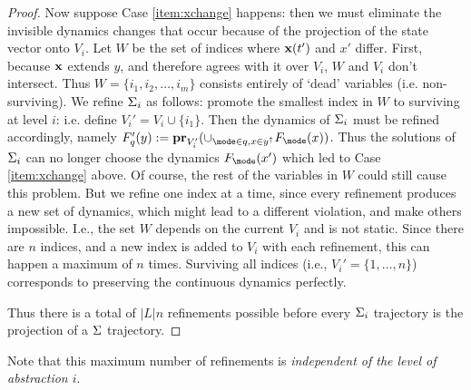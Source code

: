 \begin{proof}
	Now suppose Case \ref{item:xchange} happens: then we must eliminate the invisible dynamics changes that occur because of the projection of the state vector onto $V_i$.
	Let $W$ be the set of indices where $\mathbf{x}(t')$ and $x'$ differ. 
	First, because $\mathbf{x}$ extends $y$, and therefore agrees with it over $V_i$, $W$ and $V_i$ don't intersect. 
	Thus $W = \{i_1,i_2,\ldots,i_m\}$ consists entirely of `dead' variables (i.e. non-surviving).
	We refine $\Sigma_i$ as follows: promote the smallest index in $W$ to surviving at level $i$: i.e. define $V_i' = V_i \cup \{i_1\}$.
	Then the dynamics of $\Sigma_i$ must be refined accordingly, namely 
	$F'_q(y) \defeq \proj{\cup_{\mode \in q,x \in y^\uparrow}F_\mode(x) }{V_i'}$.
	Thus the solutions of $\Sigma_i$ can no longer choose the dynamics $F_\mode (x')$ which led to Case \ref{item:xchange} above.
	Of course, the rest of the variables in $W$ could still cause this problem.
	But we refine one index at a time, since every refinement produces a new set of dynamics, which might lead to a different violation, and make others impossible. 
	I.e., the set $W$ depends on the current $V_i$ and is not static. 
	Since there are $n$ indices, and a new index is added to $V_i$ with each refinement, this can happen a maximum of $n$ times. Surviving all indices (i.e., $V_i' = \{1,\ldots,n\}$) corresponds to preserving the continuous dynamics perfectly.
	
	Thus there is a total of $|L|n$ refinements possible before every $\Sigma_i$ trajectory is the projection of a $\Sigma$ trajectory.	
\end{proof}

	Note that this maximum number of refinements is \emph{independent of the level of abstraction $i$}.